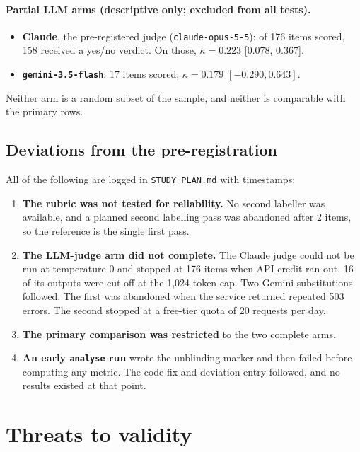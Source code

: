 \documentclass[11pt]{article}
\newcommand{\code}[1]{\texttt{#1}}
\begin{document}
\paragraph{Partial LLM arms (descriptive only; excluded from all tests).}
\begin{itemize}
  \item \textbf{Claude}, the pre-registered judge (\code{claude-opus-5-5}): of 176 items scored, 158 received a yes/no verdict. On those, $\kappa = 0.223$ [0.078, 0.367].
  \item \textbf{\code{gemini-3.5-flash}}: 17 items scored, $\kappa = 0.179$ $[-0.290, 0.643]$.
\end{itemize}
Neither arm is a random subset of the sample, and neither is comparable with the primary rows.

\subsection{Deviations from the pre-registration}\label{sec:deviations}
All of the following are logged in \code{STUDY\_PLAN.md} with timestamps:
\begin{enumerate}
  \item \textbf{The rubric was not tested for reliability.} No second labeller was available, and a planned second labelling pass was abandoned after 2 items, so the reference is the single first pass.
  \item \textbf{The LLM-judge arm did not complete.} The Claude judge could not be run at temperature 0 and stopped at 176 items when API credit ran out. 16 of its outputs were cut off at the 1{,}024-token cap. Two Gemini substitutions followed. The first was abandoned when the service returned repeated 503 errors. The second stopped at a free-tier quota of 20 requests per day.
  \item \textbf{The primary comparison was restricted} to the two complete arms.
  \item \textbf{An early \code{analyse} run} wrote the unblinding marker and then failed before computing any metric. The code fix and deviation entry followed, and no results existed at that point.
\end{enumerate}

\section{Threats to validity}
\end{document}
